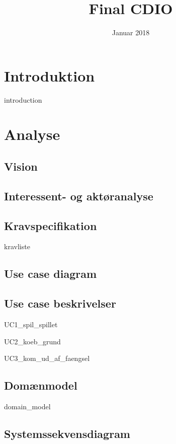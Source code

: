 \documentclass{article}
\title{Final CDIO}
\author{}
\date{Januar 2018}
\begin{document}
{\selectfont
\maketitle
\thispagestyle{empty}
\newpage
\tableofcontents
\thispagestyle{empty}
\newpage
\clearpage
\setcounter{page}{1}

\section{Introduktion}
{introduction}

\section{Analyse}
\subsection{Vision}

\subsection{Interessent- og aktøranalyse}

\subsection{Kravspecifikation}
{kravliste}

\subsection{Use case diagram}

\subsection{Use case beskrivelser}
{UC1_spil_spillet}

{UC2_koeb_grund}

{UC3_kom_ud_af_faengsel}


\newpage
\subsection{Domænmodel}
{domain_model}

\subsection{Systemssekvensdiagram}

}
\end{document}
